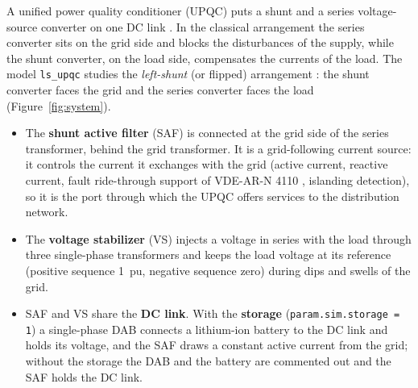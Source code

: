 \documentclass[11pt,a4paper]{scrartcl}
\newcommand{\code}[1]{\texttt{#1}}
\begin{document}
\begin{onehalfspace}
A unified power quality conditioner (UPQC) puts a shunt and a series voltage-source converter on one DC link \cite{fujita1998,khadkikar2012}. In the classical arrangement the series converter sits on the grid side and blocks the disturbances of the supply, while the shunt converter, on the load side, compensates the currents of the load. The model \code{ls\_upqc} studies the \emph{left-shunt} (or flipped) arrangement \cite{pcim_paper}: the shunt converter faces the grid and the series converter faces the load (Figure~\ref{fig:system}).

\begin{itemize}[nosep]
	\item The \textbf{shunt active filter} (SAF) is connected at the grid side of the series transformer, behind the grid transformer. It is a grid-following current source: it controls the current it exchanges with the grid (active current, reactive current, fault ride-through support of VDE-AR-N 4110 \cite{vde4110}, islanding detection), so it is the port through which the UPQC offers services to the distribution network.
	\item The \textbf{voltage stabilizer} (VS) injects a voltage in series with the load through three single-phase transformers and keeps the load voltage at its reference (positive sequence \SI{1}{pu}, negative sequence zero) during dips and swells of the grid.
	\item SAF and VS share the \textbf{DC link}. With the \textbf{storage} (\code{param.sim.storage = 1}) a single-phase DAB connects a lithium-ion battery to the DC link and holds its voltage, and the SAF draws a constant active current from the grid; without the storage the DAB and the battery are commented out and the SAF holds the DC link.
\end{itemize}


\end{onehalfspace}
\end{document}
